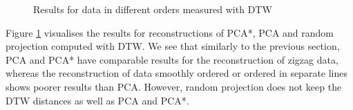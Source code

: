 \documentclass[pdftex,12pt,a4paper]{report}
\begin{document}
\begin{figure}[!htb]
    \caption{Results for data in different orders measured with DTW} \label{fig:avg_dev_dyn_low_dtw}
\end{figure}

Figure \ref{fig:avg_dev_dyn_low_dtw} visualises the results for reconstructions of PCA*, PCA and random projection computed with DTW.
We see that similarly to the previous section, PCA and PCA* have comparable results for the reconstruction of zigzag data, whereas the reconstruction of data smoothly ordered or ordered in separate lines shows poorer results than PCA.
However, random projection does not keep the DTW distances as well as PCA and PCA*.

\FloatBarrier
\end{document}
